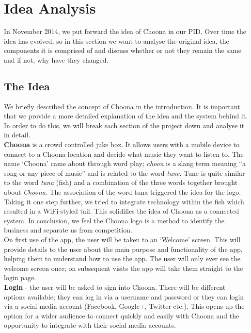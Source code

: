 \section{Idea Analysis}
In November 2014, we put forward the idea of Choona in our PID.  Over time the idea has evolved, so in this section we want to analyse the original idea, the components it is comprised of and discuss whether or not they remain the same and if not, why have they changed.

\subsection{The Idea}
We briefly described the concept of Choona in the introduction.  It is important that we provide a more detailed explanation of the idea and the system behind it.  In order to do this, we will break each section of the project down and analyse it in detail.  \\
\textbf{Choona} is a crowd controlled juke box.  It allows users with a mobile device to connect to a Choona location and decide what music they want to listen to.  The name `Choona' came about through word play; \emph{choon} is a slang term meaning ``a song or any piece of music'' and is related to the word \emph{tune}.  Tune is quite similar to the word \emph{tuna} (fish) and a combination of the three words together brought about \emph{Choona}.  The association of the word tuna triggered the idea for the logo.  Taking it one step further, we tried to integrate technology within the fish which resulted in a WiFi-styled tail.  This solidifies the idea of Choona as a connected system.  In conclusion, we feel the Choona logo is a method to identify the business and separate us from competition. \\

On first use of the app, the user will be taken to an `Welcome' screen.  This will provide details to the user about the main purpose and functionality of the app, helping them to understand how to use the app.  The user will only ever see the welcome screen once; on subsequent visits the app will take them straight to the login page.  \\

\textbf{Login} - the user will be asked to sign into Choona.  There will be different options available; they can log in via a username and password or they can login via a social media account (Facebook, Google+, Twitter etc.).  This opens up the option for a wider audience to connect quickly and easily with Choona and the opportunity to integrate with their social media accounts.  \\

